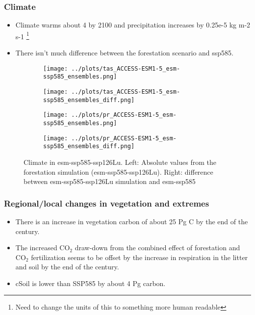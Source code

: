 \documentclass[]{article}
\begin{document}
\subsubsection{Climate}

\begin{itemize}
    \item Climate warms about 4 \textcelsius{} by 2100 and precipitation increases by 0.25e-5 kg m-2 s-1 \footnote{Need to change the units of this to something more human readable}
    \item There isn't much difference between the forestation scenario and ssp585.
\end{itemize}

\begin{figure}[H]
    \centering
    \begin{subfigure}[b]{0.45\linewidth}
        \texttt{[image: ../plots/tas\_ACCESS-ESM1-5\_esm-ssp585\_ensembles.png]}
    \end{subfigure}
    \begin{subfigure}[b]{0.45\linewidth}
        \texttt{[image: ../plots/tas\_ACCESS-ESM1-5\_esm-ssp585\_ensembles\_diff.png]}
    \end{subfigure}
    \begin{subfigure}[b]{0.45\linewidth}
        \texttt{[image: ../plots/pr\_ACCESS-ESM1-5\_esm-ssp585\_ensembles.png]}
    \end{subfigure}
    \begin{subfigure}[b]{0.45\linewidth}
        \texttt{[image: ../plots/pr\_ACCESS-ESM1-5\_esm-ssp585\_ensembles\_diff.png]}
    \end{subfigure}
    \caption{Climate in esm-ssp585-ssp126Lu. Left: Absolute values from the forestation simulation (esm-ssp585-ssp126Lu). Right: difference between esm-ssp585-ssp126Lu simulation and esm-ssp585}
    \label{fig:climate}
\end{figure}

\subsubsection{Regional/local changes in vegetation and extremes}

\begin{itemize}
    \item There is an increase in vegetation carbon of about 25 Pg C by the end of the century.
    \item The increased CO$_2$ draw-down from the combined effect of forestation and CO$_2$ fertilization seems to be offset by the increase in respiration in the litter and soil by the end of the century.
    \item cSoil is lower than SSP585 by about 4 Pg carbon.
\end{itemize}
\end{document}
